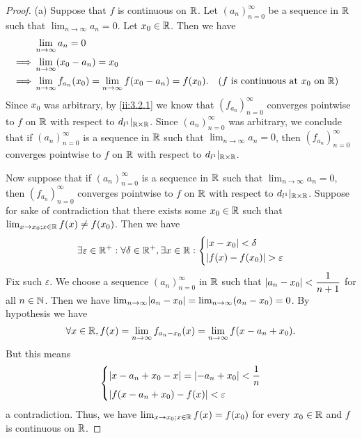 \begin{proof}{(a)}
  Suppose that \(f\) is continuous on \(\mathbb{R}\).
  Let \((a_n)_{n = 0}^\infty\) be a sequence in \(\mathbb{R}\) such that \(\lim_{n \to \infty} a_n = 0\).
  Let \(x_0 \in \mathbb{R}\).
  Then we have
  \begin{align*}
             & \lim_{n \to \infty} a_n = 0                                                                                                          \\
    \implies & \lim_{n \to \infty} (x_0 - a_n) = x_0                                                                                                \\
    \implies & \lim_{n \to \infty} f_{a_n}(x_0) = \lim_{n \to \infty} f(x_0 - a_n) = f(x_0). &  & \text{(\(f\) is continuous at \(x_0\) on \(\mathbb{R}\))}
  \end{align*}
  Since \(x_0\) was arbitrary, by \cref{ii:3.2.1} we know that \((f_{a_n})_{n = 0}^\infty\) converges pointwise to \(f\) on \(\mathbb{R}\) with respect to \(d_{l^1}|_{\mathbb{R} \times \mathbb{R}}\).
  Since \((a_n)_{n = 0}^\infty\) was arbitrary, we conclude that if \((a_n)_{n = 0}^\infty\) is a sequence in \(\mathbb{R}\) such that \(\lim_{n \to \infty} a_n = 0\), then \((f_{a_n})_{n = 0}^\infty\) converges pointwise to \(f\) on \(\mathbb{R}\) with respect to \(d_{l^1}|_{\mathbb{R} \times \mathbb{R}}\).

  Now suppose that if \((a_n)_{n = 0}^\infty\) is a sequence in \(\mathbb{R}\) such that \(\lim_{n \to \infty} a_n = 0\), then \((f_{a_n})_{n = 0}^\infty\) converges pointwise to \(f\) on \(\mathbb{R}\) with respect to \(d_{l^1}|_{\mathbb{R} \times \mathbb{R}}\).
  Suppose for sake of contradiction that there exists some \(x_0 \in \mathbb{R}\) such that \(\lim_{x \to x_0 ; x \in \mathbb{R}} f(x) \neq f(x_0)\).
  Then we have
  \[
    \exists \varepsilon \in \mathbb{R}^+ : \forall \delta \in \mathbb{R}^+, \exists x \in \mathbb{R} : \begin{dcases}
      \left\lvert x - x_0\right\rvert < \delta \\
      \left\lvert f(x) - f(x_0)\right\rvert > \varepsilon
    \end{dcases}
  \]
  Fix such \(\varepsilon\).
  We choose a sequence \((a_n)_{n = 0}^\infty\) in \(\mathbb{R}\) such that \(\left\lvert a_n - x_0\right\rvert < \dfrac{1}{n + 1}\) for all \(n \in \mathbb{N}\).
  Then we have \(\lim_{n \to \infty} \abs{a_n - x_0} = \lim_{n \to \infty} (a_n - x_0) = 0\).
  By hypothesis we have
  \[
    \forall x \in \mathbb{R}, f(x) = \lim_{n \to \infty} f_{a_n - x_0}(x) = \lim_{n \to \infty} f(x - a_n + x_0).
  \]
  But this means
  \[
    \begin{dcases}
      \left\lvert x - a_n + x_0 - x\right\rvert = \left\lvert-a_n + x_0\right\rvert < \dfrac{1}{n} \\
      \left\lvert f(x - a_n + x_0) - f(x)\right\rvert < \varepsilon
    \end{dcases}
  \]
  a contradiction.
  Thus, we have \(\lim_{x \to x_0 ; x \in \mathbb{R}} f(x) = f(x_0)\) for every \(x_0 \in \mathbb{R}\) and \(f\) is continuous on \(\mathbb{R}\).
\end{proof}

